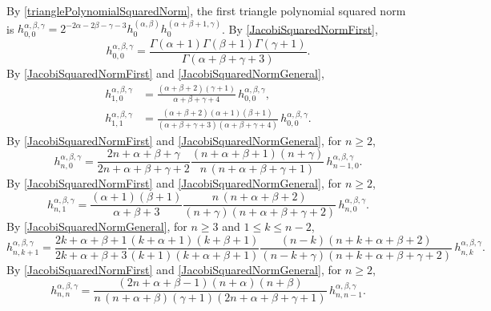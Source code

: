 \documentclass{article}
\numberwithin{equation}{section}
\numberwithin{figure}{section}
\begin{document}
By \eqref{trianglePolynomialSquaredNorm}, the first triangle polynomial squared norm is $h^{\alpha,\beta,\gamma}_{0,0} = 2^{-2\alpha-2\beta-\gamma-3} h^{(\alpha,\beta)}_0 h^{(\alpha+\beta+1,\gamma)}_0$.
By \eqref{JacobiSquaredNormFirst},
%
\begin{equation}\label{h00}
h^{\alpha,\beta,\gamma}_{0,0}
= \frac{\Gamma(\alpha+1) \Gamma(\beta+1) \Gamma(\gamma+1)}{\Gamma(\alpha+\beta+\gamma+3)}.
\end{equation}
%
By \eqref{JacobiSquaredNormFirst} and \eqref{JacobiSquaredNormGeneral},
%
\begin{align}
\label{h10}%
h^{\alpha,\beta,\gamma}_{1,0} & = \frac{(\alpha+\beta+2)(\gamma+1)}{\alpha+\beta+\gamma+4} \, h^{\alpha,\beta,\gamma}_{0,0},\\
\label{h11}%
h^{\alpha,\beta,\gamma}_{1,1} & = \frac{(\alpha+\beta+2)(\alpha+1)(\beta+1)}{(\alpha+\beta+\gamma+3)(\alpha+\beta+\gamma+4)} \, h^{\alpha,\beta,\gamma}_{0,0}.
\end{align}
%
By \eqref{JacobiSquaredNormFirst} and \eqref{JacobiSquaredNormGeneral}, for $n \geq 2$,
%
\begin{equation}\label{hn0}
h^{\alpha,\beta,\gamma}_{n,0} = \frac{2n+\alpha+\beta+\gamma}{2n+\alpha+\beta+\gamma+2} \frac{(n+\alpha+\beta+1)(n+\gamma)}{n \, (n+\alpha+\beta+\gamma+1)} \, h^{\alpha,\beta,\gamma}_{n-1,0}.
\end{equation}
%
By \eqref{JacobiSquaredNormFirst} and \eqref{JacobiSquaredNormGeneral}, for $n \geq 2$,
%
\begin{equation}\label{hn1}
h^{\alpha,\beta,\gamma}_{n,1} = \frac{(\alpha+1)(\beta+1)}{\alpha+\beta+3} \frac{n \, (n+\alpha+\beta+2)}{(n+\gamma)(n+\alpha+\beta+\gamma+2)} \, h^{\alpha,\beta,\gamma}_{n,0}.
\end{equation}
%
By \eqref{JacobiSquaredNormGeneral}, for $n \geq 3$ and $1 \leq k \leq n-2$,
%
\begin{equation}\label{hnkp1}
h^{\alpha,\beta,\gamma}_{n,k+1} = \frac{2k+\alpha+\beta+1}{2k+\alpha+\beta+3} \frac{(k+\alpha+1)(k+\beta+1)}{(k+1)(k+\alpha+\beta+1)} \frac{(n-k)(n+k+\alpha+\beta+2)}{(n-k+\gamma)(n+k+\alpha+\beta+\gamma+2)} \, h^{\alpha,\beta,\gamma}_{n,k}.
\end{equation}
%
By \eqref{JacobiSquaredNormFirst} and \eqref{JacobiSquaredNormGeneral}, for $n \geq 2$,
%
\begin{equation}\label{hnn}
h^{\alpha,\beta,\gamma}_{n,n} = \frac{(2n+\alpha+\beta-1)(n+\alpha)(n+\beta)}{n\,(n+\alpha+\beta)(\gamma+1)(2n+\alpha+\beta+\gamma+1)} \, h^{\alpha,\beta,\gamma}_{n,n-1}.
\end{equation}
%
\end{document}
